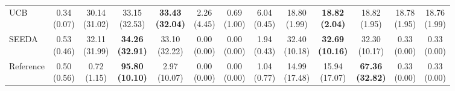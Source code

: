 {\begin{tabular}{l|cccccc|cccccc}
UCB & \makecell{0.34 \\ (0.07)} & {\cellcolor[HTML]{C8E6C9}} \makecell{30.14 \\ (31.02)} & \makecell{33.15 \\ (32.53)} & \bfseries \makecell{33.43 \\ (32.04)} & \makecell{2.26 \\ (4.45)} & \makecell{0.69 \\ (1.00)} & \makecell{6.04 \\ (0.45)} & {\cellcolor[HTML]{C8E6C9}} \makecell{18.80 \\ (1.99)} & \bfseries \makecell{18.82 \\ (2.04)} & \makecell{18.82 \\ (1.95)} & \makecell{18.78 \\ (1.95)} & \makecell{18.76 \\ (1.99)} \\
SEEDA & \makecell{0.53 \\ (0.46)} & {\cellcolor[HTML]{C8E6C9}} \makecell{32.11 \\ (31.99)} & \bfseries \makecell{34.26 \\ (32.91)} & \makecell{33.10 \\ (32.22)} & \makecell{0.00 \\ (0.00)} & \makecell{0.00 \\ (0.00)} & \makecell{1.94 \\ (0.43)} & {\cellcolor[HTML]{C8E6C9}} \makecell{32.40 \\ (10.18)} & \bfseries \makecell{32.69 \\ (10.16)} & \makecell{32.30 \\ (10.17)} & \makecell{0.33 \\ (0.00)} & \makecell{0.33 \\ (0.00)} \\
Reference & \makecell{0.50 \\ (0.56)} & {\cellcolor[HTML]{C8E6C9}} \makecell{0.72 \\ (1.15)} & \bfseries \makecell{95.80 \\ (10.10)} & \makecell{2.97 \\ (10.07)} & \makecell{0.00 \\ (0.00)} & \makecell{0.00 \\ (0.00)} & \makecell{1.04 \\ (0.77)} & {\cellcolor[HTML]{C8E6C9}} \makecell{14.99 \\ (17.48)} & \makecell{15.94 \\ (17.07)} & \bfseries \makecell{67.36 \\ (32.82)} & \makecell{0.33 \\ (0.00)} & \makecell{0.33 \\ (0.00)} \\

\end{tabular}}
